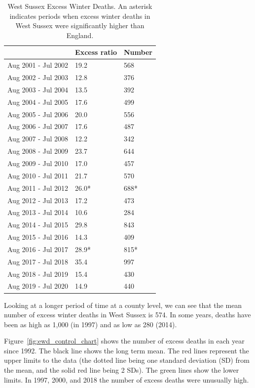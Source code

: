 \begin{table}
    \caption{West Sussex Excess Winter Deaths. An asterisk indicates periods when excess winter deaths in West Sussex were significantly higher than England.}
    \centering
    \begin{tabular}{lll}
        \toprule 
        \ & Excess ratio & Number \\
        \midrule
        Aug 2001 - Jul 2002 & 19.2 & 568 \\
        Aug 2002 - Jul 2003 & 12.8 & 376 \\
        Aug 2003 - Jul 2004 & 13.5 & 392 \\
        Aug 2004 - Jul 2005 & 17.6 & 499 \\
        Aug 2005 - Jul 2006 & 20.0 & 556 \\
        Aug 2006 - Jul 2007 & 17.6 & 487 \\
        Aug 2007 - Jul 2008 & 12.2 & 342 \\
        Aug 2008 - Jul 2009 & 23.7 & 644 \\
        Aug 2009 - Jul 2010 & 17.0 & 457 \\
        Aug 2010 - Jul 2011 & 21.7 & 570 \\
        Aug 2011 - Jul 2012 & 26.0* & 688* \\
        Aug 2012 - Jul 2013 & 17.2 & 473 \\
        Aug 2013 - Jul 2014 & 10.6 & 284 \\
        Aug 2014 - Jul 2015 & 29.8 & 843 \\
        Aug 2015 - Jul 2016 & 14.3 & 409 \\
        Aug 2016 - Jul 2017 & 28.9* & 815* \\
        Aug 2017 - Jul 2018 & 35.4 & 997 \\
        Aug 2018 - Jul 2019 & 15.4 & 430 \\
        Aug 2019 - Jul 2020 & 14.9 & 440 \\
        \bottomrule
    \end{tabular}
    \label{tab:op:exwd}
\end{table}
 
Looking at a longer period of time at a county level, we can see that the mean number of excess winter deaths in West Sussex is 574. In some years, deaths have been as high as 1,000 (in 1997) and as low as 280 (2014).

Figure~\ref{fig:ewd_control_chart} shows the number of excess deaths in each year since 1992. The black line shows the long term mean. The red lines represent the upper limits to the data (the dotted line being one standard deviation (SD) from the mean, and the solid red line being 2 SDs). The green lines show the lower limits. In 1997, 2000, and 2018 the number of excess deaths were unusually high.

